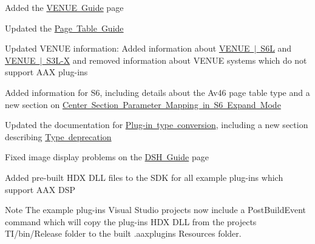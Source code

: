 \begin{DoxyItemize}
\item Added the \mbox{\hyperlink{a00849}{V\+E\+N\+UE Guide}} page 
\item Updated the \mbox{\hyperlink{a00833}{Page Table Guide}} 
\begin{DoxyItemize}
\item Updated V\+E\+N\+UE information\+: Added information about \mbox{\hyperlink{a00833_subsubsection__venue_s6l}{V\+E\+N\+UE $\vert$ S6L}} and \mbox{\hyperlink{a00833_subsubsection__venue_s3l}{V\+E\+N\+UE $\vert$ S3\+L-\/X}} and removed information about V\+E\+N\+UE systems which do not support A\+AX plug-\/ins 
\item Added information for S6, including details about the {\ttfamily \textquotesingle{}Av46\textquotesingle{}} page table type and a new section on \mbox{\hyperlink{a00833_aax_page_table_guide_04_avid_center_section_page_tables_venue_s6_mapping}{Center Section Parameter Mapping in S6 Expand Mode}}


\end{DoxyItemize}
\item Updated the documentation for \mbox{\hyperlink{a00826}{Plug-\/in type conversion}}, including a new section describing \mbox{\hyperlink{a00826_advancedTopics_relatedTypes_deprecation}{Type deprecation}} 
\item Fixed image display problems on the \mbox{\hyperlink{a00835}{D\+SH Guide}} page 
\item Added pre-\/built H\+DX D\+LL files to the S\+DK for all example plug-\/ins which support A\+AX D\+SP \begin{DoxyNote}{Note}
The example plug-\/ins\textquotesingle{} Visual Studio projects now include a {\ttfamily Post\+Build\+Event} command which will copy the plug-\/in\textquotesingle{}s H\+DX D\+LL from the project\textquotesingle{}s T\+I/bin/\+Release folder to the built .aaxplugin\textquotesingle{}s Resources folder.  
\end{DoxyNote}


\end{DoxyItemize}
